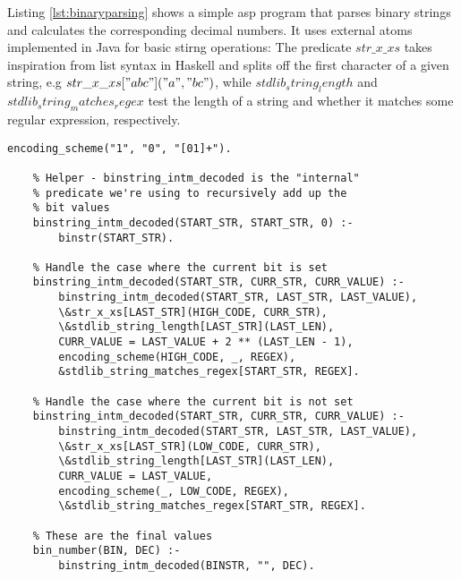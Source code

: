 \begin{example}
\label{ex:asp-binary-parsing}
Listing \ref{lst:binaryparsing} shows a simple \gls{asp} program that parses binary strings and calculates the corresponding decimal numbers. It uses external atoms implemented in Java for basic stirng operations: The predicate $str\_x\_xs$ takes inspiration from list syntax in Haskell and splits off the first character of a given string, e.g $str\_x\_xs["abc"]("a", "bc")$, while $stdlib_string_length$ and $stdlib_string_matches_regex$ test the length of a string and whether it matches some regular expression, respectively. 
\begin{lstlisting}[style=asp-code, caption=Parsing binary strings in ASP, label={lst:binaryparsing}]
    encoding_scheme("1", "0", "[01]+").

    % Helper - binstring_intm_decoded is the "internal" 
    % predicate we're using to recursively add up the 
    % bit values
    binstring_intm_decoded(START_STR, START_STR, 0) :- 
        binstr(START_STR). 
    
    % Handle the case where the current bit is set
    binstring_intm_decoded(START_STR, CURR_STR, CURR_VALUE) :- 
        binstring_intm_decoded(START_STR, LAST_STR, LAST_VALUE),
        \&str_x_xs[LAST_STR](HIGH_CODE, CURR_STR),
        \&stdlib_string_length[LAST_STR](LAST_LEN),
        CURR_VALUE = LAST_VALUE + 2 ** (LAST_LEN - 1),
        encoding_scheme(HIGH_CODE, _, REGEX),
        &stdlib_string_matches_regex[START_STR, REGEX].
    
    % Handle the case where the current bit is not set
    binstring_intm_decoded(START_STR, CURR_STR, CURR_VALUE) :- 
        binstring_intm_decoded(START_STR, LAST_STR, LAST_VALUE),
        \&str_x_xs[LAST_STR](LOW_CODE, CURR_STR),
        \&stdlib_string_length[LAST_STR](LAST_LEN),
        CURR_VALUE = LAST_VALUE,
        encoding_scheme(_, LOW_CODE, REGEX),
        \&stdlib_string_matches_regex[START_STR, REGEX].
    
    % These are the final values
    bin_number(BIN, DEC) :- 
        binstring_intm_decoded(BINSTR, "", DEC).    
\end{lstlisting}
\end{example}    

